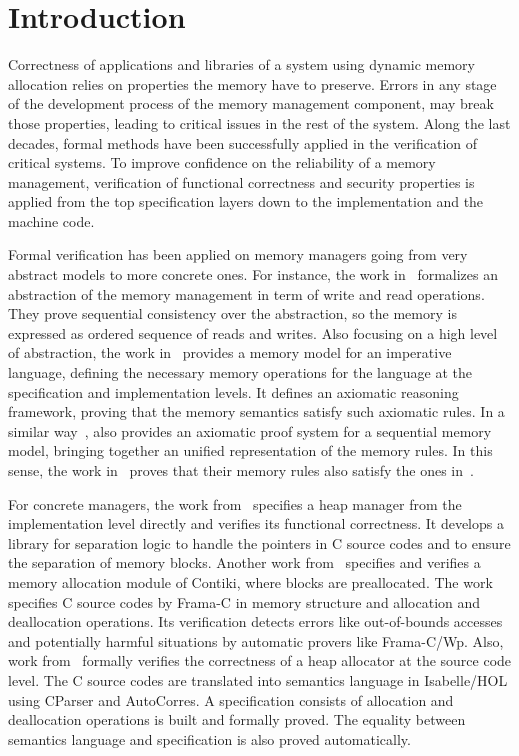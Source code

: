 \section{Introduction}
Correctness of applications and libraries of a system using dynamic memory allocation relies on properties the memory have to preserve. Errors in any stage of the development process of the memory management component, may break those properties, leading to critical issues in the rest of the system. Along the last decades, formal methods have been successfully applied in the verification of critical systems. To improve confidence on the reliability of a memory management, verification of functional correctness and security properties is applied from the top specification layers down to the implementation and the machine code.

Formal verification has been applied on memory managers going from very abstract models to more concrete ones. For instance, the work in~\cite{reg_higham} formalizes an abstraction of the memory management in term of write and read operations. They prove sequential consistency over the abstraction, so the memory is expressed as ordered sequence of reads and writes. Also focusing on a high level of abstraction, the work in~\cite{reg_blazy} provides a memory model for an imperative language, defining the necessary memory operations for the language at the specification and implementation levels. It defines an axiomatic reasoning framework, proving that the memory semantics satisfy such axiomatic rules. In a similar way~\cite{reg_mansky}, also provides an axiomatic proof system for a sequential memory model, bringing together an unified representation of the memory rules. In this sense, the work in~\cite{reg_mansky} proves that their memory rules also satisfy the ones in~\cite{reg_blazy}.

For concrete managers, the work from~\cite{reg_marti} specifies a heap manager from the implementation level directly and verifies its functional correctness. It develops a library for separation logic to handle the pointers in C source codes and to ensure the separation of memory blocks. Another work from~\cite{reg_mangano} specifies and verifies a memory allocation module of Contiki, where blocks are preallocated. The work specifies C source codes by Frama-C in memory structure and allocation and deallocation operations. Its verification detects errors like out-of-bounds accesses and potentially harmful situations by automatic provers like Frama-C/Wp. Also, work from~\cite{reg_sahebolamri} formally verifies the correctness of a heap allocator at the source code level. The C source codes are translated into semantics language in Isabelle/HOL using CParser and AutoCorres. A specification consists of allocation and deallocation operations is built and formally proved. The equality between semantics language and specification is also proved automatically.

